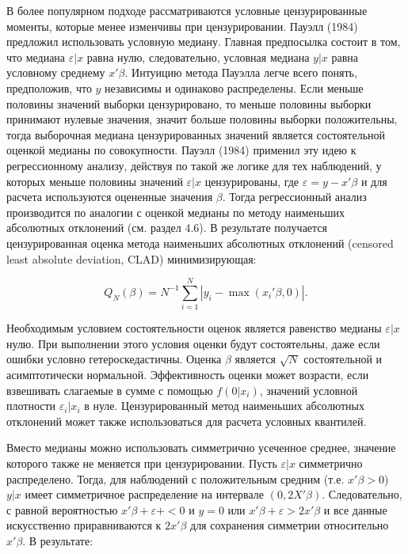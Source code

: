В более популярном подходе рассматриваются условные цензурированные моменты, которые менее изменчивы при цензурировании. Пауэлл (1984) предложил использовать условную медиану. Главная предпосылка состоит в том, что медиана $\varepsilon|x$ равна нулю, следовательно, условная медиана $y|x$ равна условному среднему $x'\beta$. Интуицию метода Пауэлла легче всего понять, предположив, что $y$ независимы и одинаково распределены. Если меньше половины значений выборки цензурировано, то меньше половины выборки принимают нулевые значения, значит больше половины выборки положительны, тогда выборочная медиана цензурированных значений является состоятельной оценкой медианы по совокупности. 
Пауэлл (1984) применил эту идею к регрессионному анализу, действуя по такой же логике для тех наблюдений, у которых меньше половины значений $\varepsilon|x$ цензурированы, где $\varepsilon=y-x'\beta$ и для расчета используются оцененные значения $\beta$.  Тогда регрессионный анализ производится по аналогии с оценкой медианы по методу наименьших абсолютных отклонений (см. раздел 4.6). В результате получается цензурированная оценка метода наименьших абсолютных отклонений (censored least absolute deviation, CLAD) минимизирующая:

\begin{equation} 
Q_N(\beta)=N^{-1}\sum_{i=1}^N|y_i-\max(x_i'\beta,0)|.
\end{equation}

Необходимым условием состоятельности оценок является равенство медианы $\varepsilon|x$ нулю. При выполнении этого условия оценки будут состоятельны, даже если  ошибки условно гетероскедастичны. Оценка $\beta$ является $\sqrt{N}$ состоятельной и асимптотически нормальной. Эффективность оценки может возрасти, если взвешивать слагаемые в сумме с помощью $f(0|x_i)$, значений условной плотности $\varepsilon_i|x_i$ в нуле. Цензурированный метод наименьших абсолютных отклонений может также использоваться для расчета условных квантилей.

Вместо медианы можно использовать симметрично усеченное среднее, значение которого также не меняется при цензурировании. Пусть $\varepsilon|x$ симметрично распределено. Тогда, для наблюдений с положительным средним (т.е. $x'\beta>0$) $y|x$ имеет симметричное распределение на интервале $(0,2X'\beta)$. Следовательно, с равной вероятностью $x'\beta+\varepsilon+<0$ и $y=0$ или $x'\beta+\varepsilon>2x'\beta$ и все данные искусственно приравниваются к $2x'\beta$ для сохранения симметрии относительно $x'\beta$. В результате:

